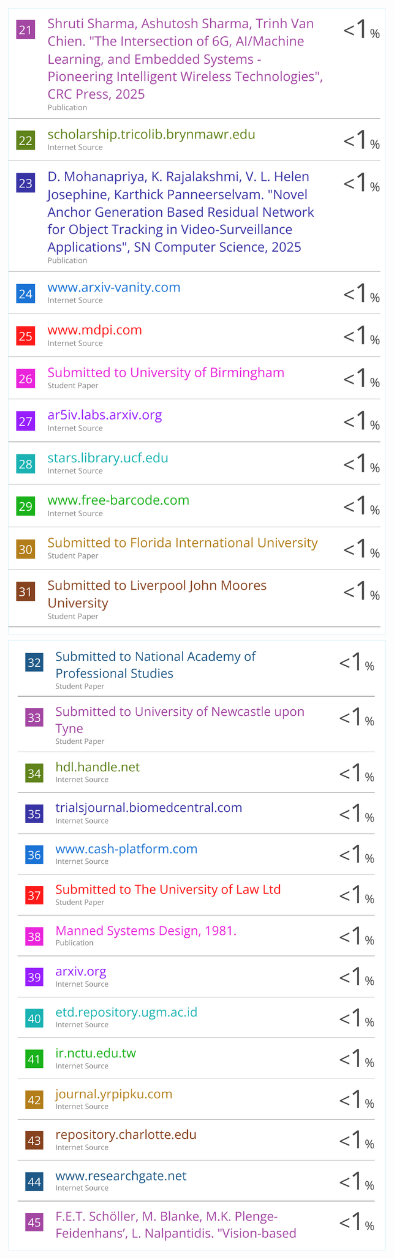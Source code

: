 \begin{center}
	\includegraphics[width=0.75\textwidth]{app/J3.pdf}
	\includegraphics[width=0.75\textwidth]{app/J4.pdf}

\end{center}
